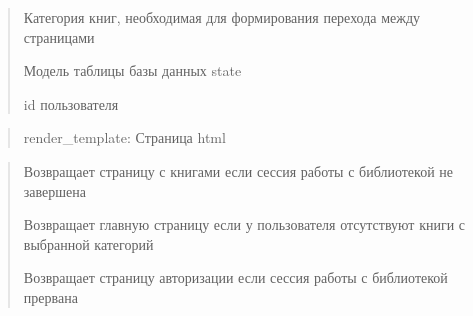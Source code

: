 \documentclass[letterpaper,10pt,russian]{sphinxmanual}
\begin{document}
\begin{fulllineitems}
\begin{description}
\begin{quote}
\begin{description}
\sphinxAtStartPar
Категория книг, необходимая для формирования перехода между страницами

\sphinxAtStartPar
Модель таблицы базы данных state

\sphinxAtStartPar
id пользователя

\end{description}\end{quote}

\end{description}
\begin{quote}\begin{description}
\sphinxAtStartPar
render\_template: Страница html

\end{description}\end{quote}
\begin{description}
\begin{quote}\begin{description}
\sphinxAtStartPar
Возвращает страницу с книгами если сессия работы с библиотекой  не завершена

\sphinxAtStartPar
Возвращает главную страницу если у пользователя отсутствуют книги с выбранной категорий

\sphinxAtStartPar
Возвращает страницу авторизации если сессия работы с библиотекой прервана

\end{description}\end{quote}

\end{description}

\end{fulllineitems}

\end{document}
